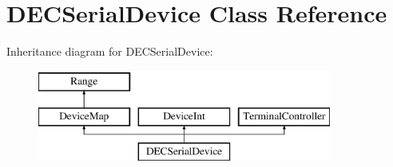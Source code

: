\hypertarget{classDECSerialDevice}{
\section{DECSerialDevice Class Reference}
\label{classDECSerialDevice}
}
Inheritance diagram for DECSerialDevice:\begin{figure}[H]
\begin{center}
\leavevmode
\includegraphics[height=3cm]{classDECSerialDevice}
\end{center}
\end{figure}
